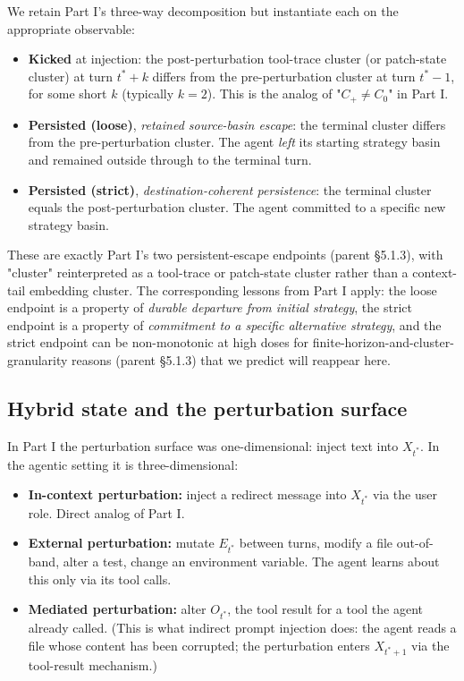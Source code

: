\documentclass{article}
\theoremstyle{plain}
\theoremstyle{definition}
\begin{document}
We retain Part I's three-way decomposition but instantiate each on the appropriate observable:

\begin{itemize}
  \item \textbf{Kicked} at injection: the post-perturbation tool-trace cluster (or patch-state cluster) at turn $t^* + k$ differs from the pre-perturbation cluster at turn $t^* - 1$, for some short $k$ (typically $k=2$). This is the analog of "$C_+ \ne C_0$" in Part I.
  \item \textbf{Persisted (loose)}, \textit{retained source-basin escape}: the terminal cluster differs from the pre-perturbation cluster. The agent \textit{left} its starting strategy basin and remained outside through to the terminal turn.
  \item \textbf{Persisted (strict)}, \textit{destination-coherent persistence}: the terminal cluster equals the post-perturbation cluster. The agent committed to a specific new strategy basin.
\end{itemize}

These are exactly Part I's two persistent-escape endpoints (parent §5.1.3), with "cluster" reinterpreted as a tool-trace or patch-state cluster rather than a context-tail embedding cluster. The corresponding lessons from Part I apply: the loose endpoint is a property of \textit{durable departure from initial strategy}, the strict endpoint is a property of \textit{commitment to a specific alternative strategy}, and the strict endpoint can be non-monotonic at high doses for finite-horizon-and-cluster-granularity reasons (parent §5.1.3) that we predict will reappear here.

\subsection{Hybrid state and the perturbation surface}

In Part I the perturbation surface was one-dimensional: inject text into $X_{t^*}$. In the agentic setting it is three-dimensional:

\begin{itemize}
  \item \textbf{In-context perturbation:} inject a redirect message into $X_{t^*}$ via the user role. Direct analog of Part I.
  \item \textbf{External perturbation:} mutate $E_{t^*}$ between turns, modify a file out-of-band, alter a test, change an environment variable. The agent learns about this only via its tool calls.
  \item \textbf{Mediated perturbation:} alter $O_{t^*}$, the tool result for a tool the agent already called. (This is what indirect prompt injection does: the agent reads a file whose content has been corrupted; the perturbation enters $X_{t^*+1}$ via the tool-result mechanism.)
\end{itemize}
\end{document}
